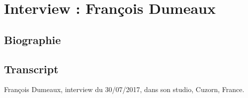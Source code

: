 \chapter{Interview : François Dumeaux}
\label{appendix:dumeaux}

\section*{Biographie}


\section*{Transcript}

François Dumeaux, interview du 30/07/2017, dans son studio, Cuzorn, France.
